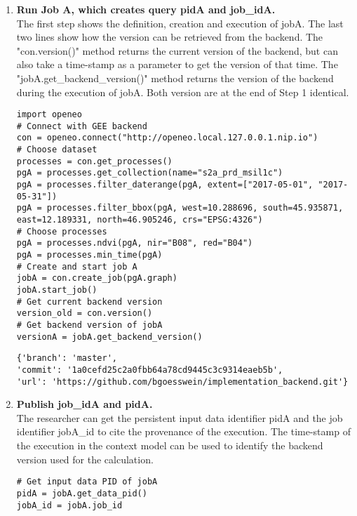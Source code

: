 \documentclass[draft,final]{vutinfth} %
\newenvironment{code}{\captionsetup{type=listing}}{}
\begin{document}
\begin{enumerate}
	\item \textbf{Run Job A, which creates query pidA and job\_idA.} \\
	The first step shows the definition, creation and execution of jobA. The last two lines show how the version can be retrieved from the backend. The "con.version()" method returns the current version of the backend, but can also take a time-stamp as a parameter to get the version of that time. The "jobA.get\_backend\_version()" method returns the version of the backend during the execution of jobA. Both version are at the end of Step 1 identical. 
	\begin{code}
		\begin{verbatim}
import openeo
# Connect with GEE backend
con = openeo.connect("http://openeo.local.127.0.0.1.nip.io")
# Choose dataset
processes = con.get_processes()
pgA = processes.get_collection(name="s2a_prd_msil1c")
pgA = processes.filter_daterange(pgA, extent=["2017-05-01", "2017-05-31"])
pgA = processes.filter_bbox(pgA, west=10.288696, south=45.935871, 
east=12.189331, north=46.905246, crs="EPSG:4326")
# Choose processes
pgA = processes.ndvi(pgA, nir="B08", red="B04")
pgA = processes.min_time(pgA)
# Create and start job A
jobA = con.create_job(pgA.graph)
jobA.start_job()
# Get current backend version
version_old = con.version()
# Get backend version of jobA 
versionA = jobA.get_backend_version()
		\end{verbatim}
		\caption{Step 1: Researcher runs Job A and gets the used backend version.}
		\label{lst:eva_jobcapture_1}
	\end{code}
	
	\begin{code}
		\begin{verbatim}
{'branch': 'master',
'commit': '1a0cefd25c2a0fbb64a78cd9445c3c9314eaeb5b',
'url': 'https://github.com/bgoesswein/implementation_backend.git'}
		\end{verbatim}
		\caption{Step 1: Version of the jobA execution version\_old.}
		\label{lst:eva_jobcapture_1_1}
	\end{code} 
	
	\item \textbf{Publish job\_idA and pidA.} \\
	The researcher can get the persistent input data identifier pidA and the job identifier jobA\_id to cite the provenance of the execution. The time-stamp of the execution in the context model can be used to identify the backend version used for the calculation.
	\begin{code}
		\begin{verbatim}
# Get input data PID of jobA 
pidA = jobA.get_data_pid()
jobA_id = jobA.job_id
		\end{verbatim}
		\caption{Researcher gets the input data PID of jobA and the job\_id of jobA.}
		\label{lst:eva_jobcapture_2}
	\end{code}
	

\end{enumerate}
\end{document}

